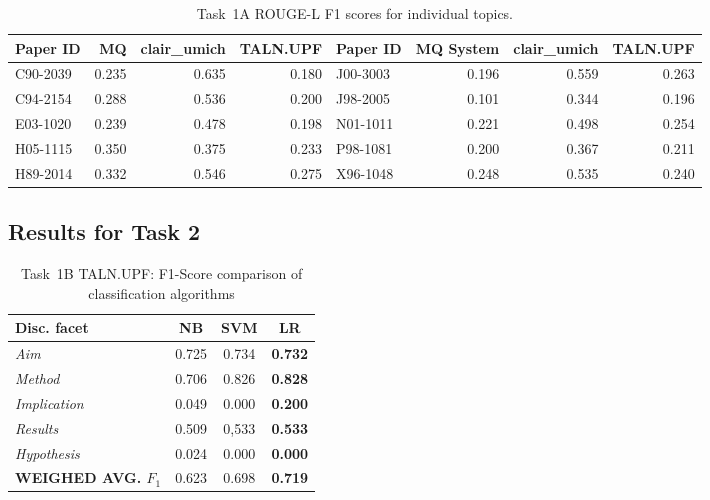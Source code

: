 \documentclass[11pt]{article}
\begin{document}
\begin{table*}
  \centering
  \begin{tabular}{|l|r|r|r||l|r|r|r|}
  	\hline
	Paper ID & MQ  & clair\_umich & TALN.UPF & Paper ID & MQ System & clair\_umich & TALN.UPF\\
	\hline
	C90-2039 & 0.235 & 0.635 & 0.180 & J00-3003 & 0.196 & 0.559& 0.263\\
	C94-2154 & 0.288 & 0.536 & 0.200 & J98-2005 & 0.101 & 0.344& 0.196\\
	E03-1020 & 0.239 & 0.478 & 0.198 & N01-1011 & 0.221 & 0.498& 0.254\\
	H05-1115 & 0.350 & 0.375 & 0.233 & P98-1081 & 0.200 & 0.367& 0.211\\
	H89-2014 & 0.332 & 0.546 & 0.275 & X96-1048 & 0.248 & 0.535& 0.240\\
	\hline
  \end{tabular}
\caption{Task~1A ROUGE-L F1 scores for individual topics.}
\label{tab:task1av2}
\end{table*}
\subsection{Results for Task 2}

\begin{table}[h]\footnotesize
  \begin{center}
  \begin{tabular}{ | l | c | c | c |}
    \hline
    Disc. facet & NB & SVM & \textbf{LR} \\ \hline
    \textit{Aim} & 0.725 & 0.734 & \textbf{0.732} \\ \hline
    \textit{Method} & 0.706 & 0.826 & \textbf{0.828} \\ \hline
    \textit{Implication} & 0.049 & 0.000 & \textbf{0.200} \\ \hline
    \textit{Results} & 0.509 & 0,533 & \textbf{0.533} \\ \hline
    \textit{Hypothesis} & 0.024 & 0.000 &\textbf{ 0.000} \\ \hline
    \textbf{WEIGHED AVG. $F_1$} & 0.623 & 0.698 & \textbf{0.719} \\ \hline
    \hline
  \end{tabular}
  \caption{ Task~1B TALN.UPF: F1-Score comparison of classification algorithms}
  \label{table:task1bAlgorithmComp}
  \end{center}
\end{table}
\end{document}

